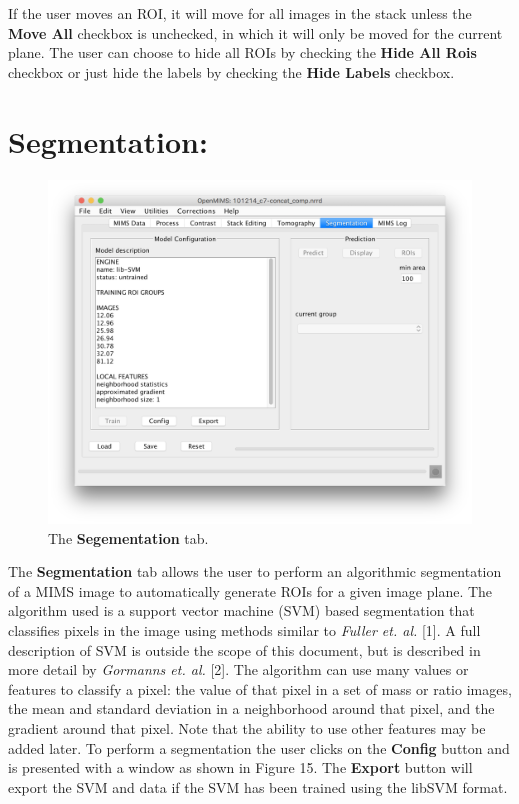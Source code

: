 \documentclass{article}
\begin{document}
	If the user moves an ROI, it will move for all images in the stack 
	unless the \textbf{Move All} checkbox is unchecked, in which it will 
	only be moved for the current plane. The user can choose to hide all
	ROIs by checking the \textbf{Hide All Rois} checkbox or just hide the labels
	by checking the \textbf{Hide Labels} checkbox.
	






\newpage
\section*{Segmentation:}
	
	\begin{figure}[ht]
	\centering
	\includegraphics[scale=0.70]{snapshotMimsSegmentation.png}
	\caption{The \textbf{Segementation} tab.}
	\end{figure}
	The \textbf{Segmentation} tab allows the user to perform an algorithmic segmentation of a MIMS
	 image to automatically generate ROIs for a given image plane. The algorithm used is a support 
	 vector machine (SVM) based segmentation that classifies pixels in the image using methods 
	 similar to \textit{Fuller et. al.} [1]. A full description of SVM is outside the scope of this document, 
	 but is described in more detail by \textit {Gormanns et. al.} [2].  The algorithm can use many 
	 values or features to classify a pixel: the value of that pixel in a set of mass or ratio images, the 
	 mean and standard deviation in a neighborhood around that pixel, and the gradient around that
	  pixel. Note that the ability to use other features may be added later. To perform a segmentation
	   the user clicks on the \textbf{Config} button and is presented with a window as shown in Figure 15. 
	    The \textbf{Export} button will export the SVM and data if the SVM has been trained using the libSVM format.
\end{document}

